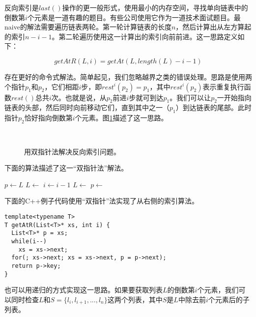 \documentclass[UTF8]{article}
\begin{document}
反向索引是$last()$操作的更一般形式，使用最小的内存空间，寻找单向链表中的倒数第$i$个元素是一道有趣的题目。有些公司使用它作为一道技术面试题目。最naive的解法需要遍历链表两轮。第一轮计算链表的长度$n$，然后计算出从左方算起的索引$n - i - 1$。第二轮遍历使用这一计算出的索引向前前进。这一思路定义如下：

\[
  getAtR(L, i) = getAt(L, length(L) - i -1)
\]

存在更好的命令式解法。简单起见，我们忽略越界之类的错误处理。思路是使用两个指针$p_1$和$p_2$，它们相距$i$步，即$rest^i(p_2) = p_1$，其中$rest^i(p_2)$表示重复执行函数$rest()$总共$i$次。也就是说，从$p_2$前进$i$步就可到达$p_1$。我们可以让$p_2$一开始指向链表的头部，然后同时向前移动它们，直到其中之一（$p_1$）到达链表的尾部。此时指针$p_2$恰好指向倒数第$i$个元素。图\ref{fig:list-rindex}描述了这一思路。

\begin{figure}[htbp]
    \centering
     \\
    \caption{用双指针法解决反向索引问题。} \label{fig:list-rindex}
\end{figure}

下面的算法描述了这一“双指针法”解法。

\begin{algorithmic}[1]
  \State $p \gets L$
    \State $L \gets $ 
    \State $i \gets i - 1$
  \EndWhile
    \State $L \gets$ 
    \State $p \gets$ 
  \EndWhile
  \State \Return {}
\EndFunction
\end{algorithmic}

下面的C++例子代码使用“双指针”法实现了从右侧的索引算法。

\lstset{language=C++}
\begin{lstlisting}
template<typename T>
T getAtR(List<T>* xs, int i) {
  List<T>* p = xs;
  while(i--)
    xs = xs->next;
  for(; xs->next; xs = xs->next, p = p->next);
  return p->key;
}
\end{lstlisting}

也可以用递归的方式实现这一思路。如果要获取列表$L$的倒数第$i$个元素，我们可以同时检查$L$和$S=\{l_i, l_{i+1}, ..., l_n\}$这两个列表，其中$S$是$L$中除去前$i$个元素后的子列表。
\end{document}
